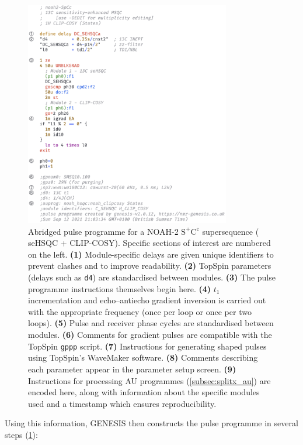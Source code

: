 \documentclass[a4paper,11pt]{article}
\newcommand{\carbon}{\ce{^{13}C}}
\begin{document}
\begin{figure}
    \centering
    \includegraphics[width=0.8\textwidth]{pulprog_code.png}
    \caption{
        Abridged pulse programme for a NOAH-2 $\mathrm{S^+C^c}$ supersequence (\carbon{} seHSQC + CLIP-COSY).
        Specific sections of interest are numbered on the left.
        \textbf{(1)} Module-specific delays are given unique identifiers to prevent clashes and to improve readability.
        \textbf{(2)} TopSpin parameters (delays such as \texttt{d4}) are standardised between modules.
        \textbf{(3)} The pulse programme instructions themselves begin here.
        \textbf{(4)} $t_1$ incrementation and echo--antiecho gradient inversion is carried out with the appropriate frequency (once per loop or once per two loops).
        \textbf{(5)} Pulse and receiver phase cycles are standardised between modules.
        \textbf{(6)} Comments for gradient pulses are compatible with the TopSpin \texttt{gppp} script.
        \textbf{(7)} Instructions for generating shaped pulses using TopSpin's WaveMaker software.
        \textbf{(8)} Comments describing each parameter appear in the parameter setup screen.
        \textbf{(9)} Instructions for processing AU programmes (\cref{subsec:splitx_au}) are encoded here, along with information about the specific modules used and a timestamp which ensures reproducibility.
    }
    \label{fig:pulprog_code}
\end{figure}

Using this information, GENESIS then constructs the pulse programme in several steps (\cref{fig:pulprog_code}):
\end{document}
